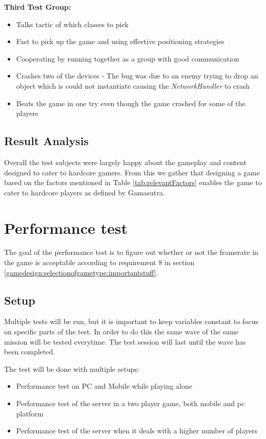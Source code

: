 \textbf{Third Test Group:}\\
\begin{itemize}
\item Talks tactic of which classes to pick
\item Fast to pick up the game and using effective positioning strategies
\item Cooperating by running together as a group with good communication
\item Crashes two of the devices - The bug was due to an enemy trying to drop an object which is could not instantiate causing the \textit{NetworkHandler} to crash
\item Beats the game in one try even though the game crashed for some of the players
\end{itemize}

\subsection{Result Analysis}
Overall the test subjects were largely happy about the gameplay and content designed to cater to hardcore gamers.
From this we gather that designing a game based on the factors mentioned in Table \ref{tab:relevantFactors} enables the game to cater to hardcore players as defined by Gamasutra\cite{casual_vs_hardcore}.

\section{Performance test}
The goal of the performance test is to figure out whether or not the framerate in the game is acceptable according to requirement 8 in section \ref{gamedesign:selectionofgametype:importantstuff}. 

\subsection{Setup}
Multiple tests will be run, but it is important to keep variables constant to focus on specific parts of the test. In order to do this the same wave of the same mission will be tested everytime. The test session will last until the wave has been completed. 

The test will be done with multiple setups:
\begin{itemize}
\item Performance test on PC and Mobile while playing alone
\item Performance test of the server in a two player game, both mobile and pc platform
\item Performance test of the server when it deals with a higher number of players
\end{itemize}

